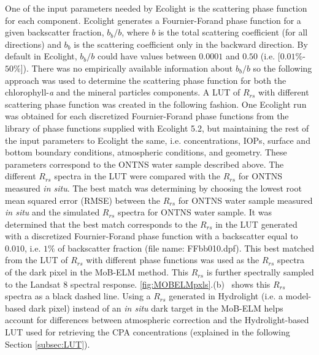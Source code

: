 \documentclass[onecolumn,3p,letterpaper]{elsarticle}
\begin{document}
One of the input parameters needed by Ecolight is the scattering phase function for each component. Ecolight generates a Fournier-Forand phase function for a given backscatter fraction, $b_b/b$, where $b$ is the total scattering coefficient (for all directions) and $b_b$ is the scattering coefficient only in the backward direction. By default in Ecolight, $b_b/b$ could have values between $0.0001$ and $0.50$ (i.e. [$0.01\%$-$50\%$]). There was no empirically available information about $b_b/b$ so the following approach was used to determine the scattering phase function for both the chlorophyll-{\it a} and the mineral particles components. A LUT of $R_{rs}$ with different scattering phase function was created in the following fashion. One Ecolight run was obtained for each discretized Fournier-Forand phase functions from the library of phase functions supplied with Ecolight 5.2, but maintaining the rest of the input parameters to Ecolight the same, i.e. concentrations, IOPs, surface and bottom boundary conditions, atmospheric conditions, and geometry. These parameters correspond to the ONTNS water sample described above. The different $R_{rs}$ spectra in the LUT were compared with the $R_{rs}$ for ONTNS measured {\it in situ}. The best match was determining by choosing the lowest root mean squared error (RMSE) between the $R_{rs}$ for ONTNS water sample measured {\it in situ} and the simulated $R_{rs}$ spectra for ONTNS water sample. It was determined that the best match corresponds to the $R_{rs}$ in the LUT generated with a discretized Fournier-Forand phase function with a backscatter equal to $0.010$, i.e. $1\%$ of backscatter fraction (file name: FFbb010.dpf). %
This best matched from the LUT of $R_{rs}$ with different phase functions was used as the $R_{rs}$ spectra of the dark pixel in the MoB-ELM method. This $R_{rs}$ is further spectrally sampled to the Landsat 8 spectral response. \autoref{fig:MOBELMpxls}.(b)~ shows this $R_{rs}$ spectra as a black dashed line. Using a $R_{rs}$ generated in Hydrolight (i.e. a model-based dark pixel) instead of an {\it in situ} dark target in the MoB-ELM helps account for differences between atmospheric correction and the Hydrolight-based LUT used for retrieving the CPA concentrations (explained in the following Section \ref{subsec:LUT}).
\end{document}

